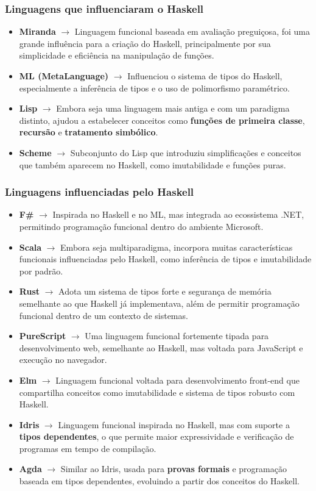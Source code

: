 \subsubsection{Linguagens que influenciaram o Haskell}
\begin{itemize}
    \item \textbf{Miranda} $\rightarrow$ Linguagem funcional baseada em avaliação preguiçosa, foi uma grande influência para a criação do Haskell, principalmente por sua simplicidade e eficiência na manipulação de funções.
    \item \textbf{ML (MetaLanguage)} $\rightarrow$ Influenciou o sistema de tipos do Haskell, especialmente a inferência de tipos e o uso de polimorfismo paramétrico.
    \item \textbf{Lisp} $\rightarrow$ Embora seja uma linguagem mais antiga e com um paradigma distinto, ajudou a estabelecer conceitos como \textbf{funções de primeira classe}, \textbf{recursão} e \textbf{tratamento simbólico}.
    \item \textbf{Scheme} $\rightarrow$ Subconjunto do Lisp que introduziu simplificações e conceitos que também aparecem no Haskell, como imutabilidade e funções puras.
\end{itemize}

\subsubsection{Linguagens influenciadas pelo Haskell}
\begin{itemize}
    \item \textbf{F#} $\rightarrow$ Inspirada no Haskell e no ML, mas integrada ao ecossistema .NET, permitindo programação funcional dentro do ambiente Microsoft.
    \item \textbf{Scala} $\rightarrow$ Embora seja multiparadigma, incorpora muitas características funcionais influenciadas pelo Haskell, como inferência de tipos e imutabilidade por padrão.
    \item \textbf{Rust} $\rightarrow$ Adota um sistema de tipos forte e segurança de memória semelhante ao que Haskell já implementava, além de permitir programação funcional dentro de um contexto de sistemas.
    \item \textbf{PureScript} $\rightarrow$ Uma linguagem funcional fortemente tipada para desenvolvimento web, semelhante ao Haskell, mas voltada para JavaScript e execução no navegador.
    \item \textbf{Elm} $\rightarrow$ Linguagem funcional voltada para desenvolvimento front-end que compartilha conceitos como imutabilidade e sistema de tipos robusto com Haskell.
    \item \textbf{Idris} $\rightarrow$ Linguagem funcional inspirada no Haskell, mas com suporte a \textbf{tipos dependentes}, o que permite maior expressividade e verificação de programas em tempo de compilação.
    \item \textbf{Agda} $\rightarrow$ Similar ao Idris, usada para \textbf{provas formais} e programação baseada em tipos dependentes, evoluindo a partir dos conceitos do Haskell.
\end{itemize}

